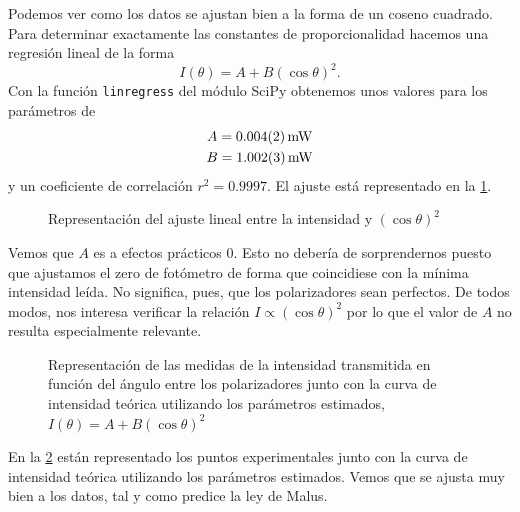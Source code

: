 \documentclass[12pt]{article}
\numberwithin{table}{section}
\numberwithin{figure}{section}
\numberwithin{equation}{section}
\newcommand{\data}[3]{\SI{#1 \pm #2}{#3}}
\begin{document}
Podemos ver como los datos se ajustan bien a la forma de un coseno cuadrado. Para determinar exactamente las constantes de proporcionalidad hacemos una regresión lineal de la forma
\begin{equation} \label{eqn:regresión}
	I(\theta) = A + B(\cos{\theta})^2.
\end{equation}
Con la función \texttt{linregress} del módulo \textsf{SciPy} obtenemos unos valores para los parámetros de
\begin{equation} \label{eqn:parametros}
	\begin{gathered}
		A = \data{0.004}{0.002}{mW} \\
		B = \data{1.002}{0.003}{mW}
	\end{gathered}
\end{equation}
y un coeficiente de correlación \( r^2 = \num{0.9997} \). El ajuste está representado en la \cref{fig:regr}.

\begin{figure}[htb]
	\centering \small \sffamily
	
	\caption{Representación del ajuste lineal entre la intensidad y \( (\cos{\theta})^2 \)}  
	\label{fig:regr}
\end{figure}

Vemos que \( A \) es a efectos prácticos 0. Esto no debería de sorprendernos puesto que ajustamos el zero de fotómetro de forma que coincidiese con la mínima intensidad leída. No significa, pues, que los polarizadores sean perfectos. De todos modos, nos interesa verificar la relación \( I \propto (\cos{\theta})^2 \) por lo que el valor de \( A \) no resulta especialmente relevante.

\begin{figure}[htb]
	\centering \small \sffamily
	
	\caption{Representación de las medidas de la intensidad transmitida en función del ángulo entre los polarizadores junto con la curva de intensidad teórica utilizando los parámetros estimados, \( I(\theta) = A + B(\cos{\theta})^2 \)}  
	\label{fig:malus-2}
\end{figure}

En la \cref{fig:malus-2} están representado los puntos experimentales junto con la curva de intensidad teórica utilizando los parámetros estimados. Vemos que se ajusta muy bien a los datos, tal y como predice la ley de Malus.
\end{document}
